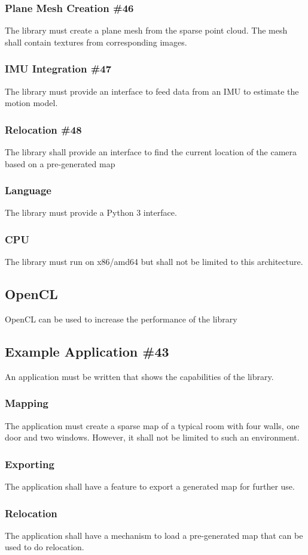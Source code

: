 \documentclass[11pt,a4paper,titlepage,oneside]{report}
\begin{document}
\subsubsection{Plane Mesh Creation \#46}
The library must create a plane mesh from the sparse point cloud. The mesh shall contain textures from corresponding images.
\subsubsection{IMU Integration \#47}
The library must provide an interface to feed data from an IMU to estimate the motion model.
\subsubsection{Relocation \#48}
The library shall provide an interface to find the current location of the camera based on a pre-generated map
\subsubsection{Language}
The library must provide a Python 3 interface.
\subsubsection{CPU}
The library must run on x86/amd64 but shall not be limited to this architecture.
\subsection{OpenCL}
OpenCL can be used to increase the performance of the library
\subsection{Example Application \#43}
An application must be written that shows the capabilities of the library. 
\subsubsection{Mapping}
The application must create a sparse map of a typical room with four walls, one door and two windows. However, it shall not be limited to such an environment.
\subsubsection{Exporting}
The application shall have a feature to export a generated map for further use.
\subsubsection{Relocation}
The application shall have a mechanism to load a pre-generated map that can be used to do relocation.
\end{document}
